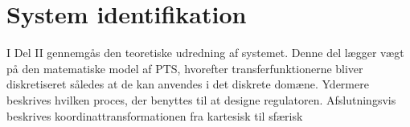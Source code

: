 \part{System identifikation}
I Del II gennemgås den teoretiske udredning af systemet. Denne del lægger vægt på den matematiske model af PTS, hvorefter transferfunktionerne bliver diskretiseret således at de kan anvendes i det diskrete domæne. Ydermere beskrives hvilken proces, der benyttes til at designe regulatoren.
Afslutningsvis beskrives koordinattransformationen fra kartesisk til sfærisk




